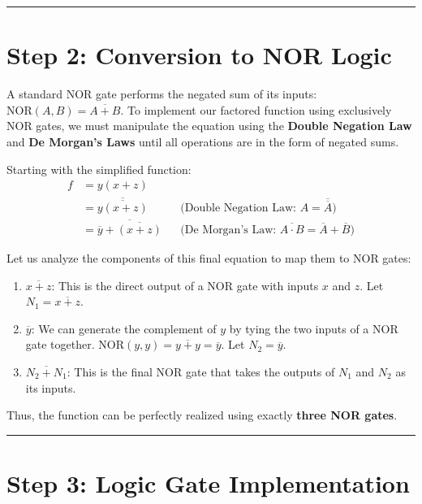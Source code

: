 \documentclass[12pt,a3paper]{article}
\begin{document}
\begin{enumerate}
\begin{tcolorbox}[enhanced,breakable,ansbox,colback=cA!4,colframe=cA,boxrule=0.8pt,arc=5pt,title={\textbf{Answer}},fonttitle=\bfseries\color{white},colbacktitle=cA]
\vspace{0.2cm}
\hrule
\vspace{0.4cm}

\section*{Step 2: Conversion to NOR Logic}

A standard NOR gate performs the negated sum of its inputs: $\text{NOR}(A, B) = \overline{A + B}$. To implement our factored function using exclusively NOR gates, we must manipulate the equation using the \textbf{Double Negation Law} and \textbf{De Morgan's Laws} until all operations are in the form of negated sums.

Starting with the simplified function:
\begin{align*}
    f &= y(x + z) \\
    &= \overline{\overline{y(x + z)}} && \text{(Double Negation Law: } A = \overline{\overline{A}} \text{)} \\
    &= \overline{ \overline{y} + \overline{(x + z)} } && \text{(De Morgan's Law: } \overline{A \cdot B} = \overline{A} + \overline{B} \text{)}
\end{align*}

Let us analyze the components of this final equation to map them to NOR gates:
\begin{enumerate}
    \item \textcolor{cA}{$\overline{x + z}$}: This is the direct output of a NOR gate with inputs $x$ and $z$. Let $N_1 = \overline{x + z}$.
    \item \textcolor{cA}{$\overline{y}$}: We can generate the complement of $y$ by tying the two inputs of a NOR gate together. $\text{NOR}(y, y) = \overline{y + y} = \overline{y}$. Let $N_2 = \overline{y}$.
    \item \textcolor{cA}{$\overline{ N_2 + N_1 }$}: This is the final NOR gate that takes the outputs of $N_1$ and $N_2$ as its inputs.
\end{enumerate}

Thus, the function can be perfectly realized using exactly \textbf{three NOR gates}.

\vspace{0.2cm}
\hrule
\vspace{0.4cm}

\section*{Step 3: Logic Gate Implementation}


\end{tcolorbox}
\end{enumerate}
\end{document}
